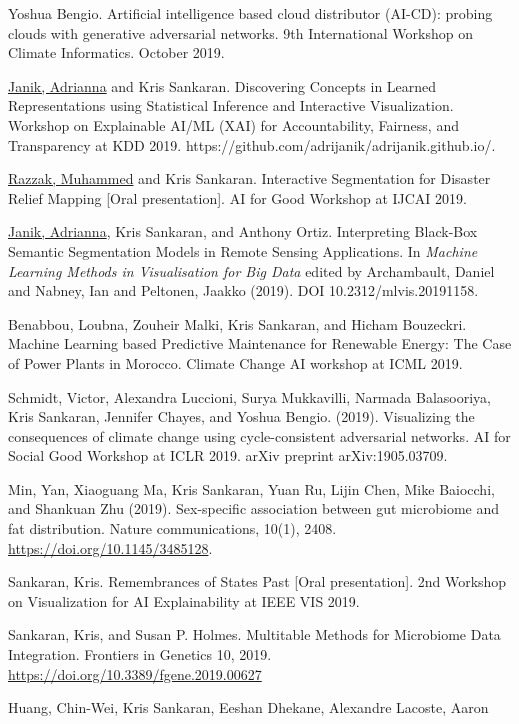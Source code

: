 \documentclass[letterpaper]{article}
\renewenvironment{itemize}{
  \begin{list}{}{
    \setlength{\leftmargin}{1.5em}
  }
}{
  \end{list}
}
\begin{document}
\begin{itemize}
  Yoshua Bengio. Artificial intelligence based cloud distributor (AI-CD):
  probing clouds with generative adversarial networks. 9th International
  Workshop on Climate Informatics. October 2019.
\item \underline{Janik, Adrianna} and Kris Sankaran. Discovering Concepts in
Learned Representations using Statistical Inference and Interactive
Visualization. Workshop on Explainable AI/ML (XAI) for Accountability,
Fairness, and Transparency at KDD 2019.
https://github.com/adrijanik/adrijanik.github.io/.
\item \underline{Razzak, Muhammed} and Kris Sankaran. Interactive Segmentation
for Disaster Relief Mapping [Oral presentation]. AI for Good Workshop at IJCAI
2019.
\item \underline{Janik, Adrianna}, Kris Sankaran, and Anthony Ortiz.
Interpreting Black-Box Semantic Segmentation Models in Remote Sensing
Applications. In \textit{Machine Learning Methods in Visualisation for Big
Data} edited by Archambault, Daniel and Nabney, Ian and Peltonen, Jaakko
(2019). DOI 10.2312/mlvis.20191158.
\item Benabbou, Loubna, Zouheir Malki, Kris Sankaran, and Hicham Bouzeckri.
  Machine Learning based Predictive Maintenance for Renewable Energy: The Case
  of Power Plants in Morocco. Climate Change AI workshop at ICML 2019.
\item Schmidt, Victor, Alexandra Luccioni, Surya Mukkavilli, Narmada
  Balasooriya, Kris Sankaran, Jennifer Chayes, and Yoshua Bengio. (2019).
  Visualizing the consequences of climate change using cycle-consistent
  adversarial networks. AI for Social Good Workshop at ICLR 2019. arXiv
  preprint arXiv:1905.03709.
\item Min, Yan, Xiaoguang Ma, Kris Sankaran, Yuan Ru, Lijin Chen, Mike
  Baiocchi, and Shankuan Zhu (2019). Sex-specific association between gut
  microbiome and fat distribution. Nature communications, 10(1), 2408.
\href{https://doi.org/10.1145/3485128}{https://doi.org/10.1145/3485128}.
\item Sankaran, Kris. Remembrances of States Past [Oral presentation]. 2nd
  Workshop on Visualization for AI Explainability at IEEE VIS 2019.
\item Sankaran, Kris, and Susan P. Holmes. Multitable Methods for Microbiome
Data Integration. Frontiers in Genetics 10, 2019.
\href{https://doi.org/10.3389/fgene.2019.00627}{https://doi.org/10.3389/fgene.2019.00627}
\item Huang, Chin-Wei, Kris Sankaran, Eeshan Dhekane, Alexandre Lacoste, Aaron

\end{itemize}
\end{document}
